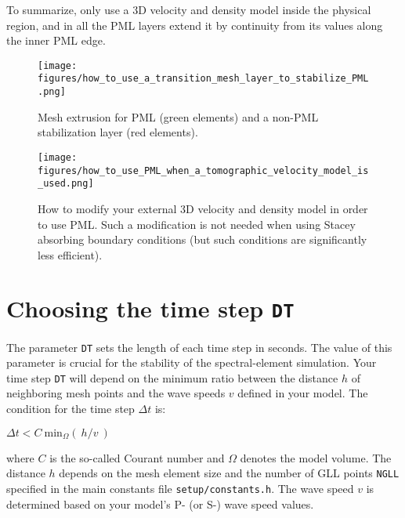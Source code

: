 To summarize, only use a 3D velocity and density model inside the
physical region, and in all the PML layers extend it by continuity
from its values along the inner PML edge.\newline

\begin{figure}[htbp]
\noindent \begin{centering}
\texttt{[image: figures/how\_to\_use\_a\_transition\_mesh\_layer\_to\_stabilize\_PML.png]}
\par\end{centering}
\caption{Mesh extrusion for PML (green elements) and a non-PML stabilization layer (red elements).}
\label{fig:mesh_extrusion}
\end{figure}

\begin{figure}[htbp]
\noindent \begin{centering}
\texttt{[image: figures/how\_to\_use\_PML\_when\_a\_tomographic\_velocity\_model\_is\_used.png]}
\par\end{centering}
\caption{How to modify your external 3D velocity and density model in order
to use PML. Such a modification is not needed when using Stacey absorbing
boundary conditions (but such conditions are significantly less efficient).}
\label{fig:modify_external_velocity_model_to_use_PML}
\end{figure}


\section{Choosing the time step \texttt{DT}}\label{sec:Choosing-the-Time-Step}

The parameter \texttt{DT} sets the length of each time step in seconds.
The value of this parameter is crucial for the stability of the spectral-element
simulation. Your time step \texttt{DT} will depend on the minimum
ratio between the distance $h$ of neighboring mesh points and the
wave speeds $v$ defined in your model. The condition for the time
step $\Delta t$ is:
\begin{lyxcode}
$\Delta t<C~\mathrm{min}_{\Omega}(~h/v~)$
\end{lyxcode}
where $C$ is the so-called Courant number and $\Omega$ denotes the
model volume. The distance $h$ depends on the mesh element size and
the number of GLL points \texttt{NGLL} specified in the main constants
file \texttt{setup/constants.h}. The wave speed $v$ is determined based on your model's P- (or S-)
wave speed values.\newline


